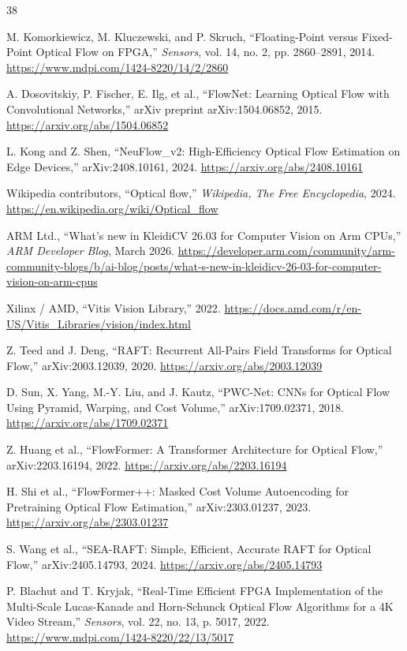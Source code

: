 \documentclass[conference]{IEEEtran}
\begin{document}
\begin{thebibliography}{38}

M. Komorkiewicz, M. Kluczewski, and P. Skruch, ``Floating-Point versus Fixed-Point Optical Flow on FPGA,'' \textit{Sensors}, vol. 14, no. 2, pp. 2860--2891, 2014. \url{https://www.mdpi.com/1424-8220/14/2/2860}

A. Dosovitskiy, P. Fischer, E. Ilg, et al., ``FlowNet: Learning Optical Flow with Convolutional Networks,'' arXiv preprint arXiv:1504.06852, 2015. \url{https://arxiv.org/abs/1504.06852}

L. Kong and Z. Shen, ``NeuFlow\_v2: High-Efficiency Optical Flow Estimation on Edge Devices,'' arXiv:2408.10161, 2024. \url{https://arxiv.org/abs/2408.10161}

Wikipedia contributors, ``Optical flow,'' \textit{Wikipedia, The Free Encyclopedia}, 2024. \url{https://en.wikipedia.org/wiki/Optical_flow}

ARM Ltd., ``What's new in KleidiCV 26.03 for Computer Vision on Arm CPUs,'' \textit{ARM Developer Blog}, March 2026. \url{https://developer.arm.com/community/arm-community-blogs/b/ai-blog/posts/what-s-new-in-kleidicv-26-03-for-computer-vision-on-arm-cpus}

Xilinx / AMD, ``Vitis Vision Library,'' 2022. \url{https://docs.amd.com/r/en-US/Vitis_Libraries/vision/index.html}

Z. Teed and J. Deng, ``RAFT: Recurrent All-Pairs Field Transforms for Optical Flow,'' arXiv:2003.12039, 2020. \url{https://arxiv.org/abs/2003.12039}

D. Sun, X. Yang, M.-Y. Liu, and J. Kautz, ``PWC-Net: CNNs for Optical Flow Using Pyramid, Warping, and Cost Volume,'' arXiv:1709.02371, 2018. \url{https://arxiv.org/abs/1709.02371}

Z. Huang et al., ``FlowFormer: A Transformer Architecture for Optical Flow,'' arXiv:2203.16194, 2022. \url{https://arxiv.org/abs/2203.16194}

H. Shi et al., ``FlowFormer++: Masked Cost Volume Autoencoding for Pretraining Optical Flow Estimation,'' arXiv:2303.01237, 2023. \url{https://arxiv.org/abs/2303.01237}

S. Wang et al., ``SEA-RAFT: Simple, Efficient, Accurate RAFT for Optical Flow,'' arXiv:2405.14793, 2024. \url{https://arxiv.org/abs/2405.14793}

P. Blachut and T. Kryjak, ``Real-Time Efficient FPGA Implementation of the Multi-Scale Lucas-Kanade and Horn-Schunck Optical Flow Algorithms for a 4K Video Stream,'' \textit{Sensors}, vol. 22, no. 13, p. 5017, 2022. \url{https://www.mdpi.com/1424-8220/22/13/5017}


\end{thebibliography}
\end{document}
